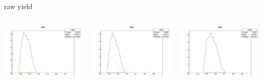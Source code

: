 \begin{frame}{raw yield}
\begin{columns}
\begin{column}[T]{0.25\textwidth}
\includegraphics[width = \textwidth]{results/yield/statistics/yield_x_Q2_z_0.55_5.500_0.45_pos.png}
\end{column}
\begin{column}[T]{0.25\textwidth}
\includegraphics[width = \textwidth]{results/yield/statistics/yield_x_Q2_z_0.55_5.500_0.45_neg.png}
\end{column}
\begin{column}[T]{0.25\textwidth}
\includegraphics[width = \textwidth]{results/yield/statistics/yield_x_Q2_z_0.55_5.500_0.55_pos.png}

\end{column}
\end{columns}
\end{frame}
